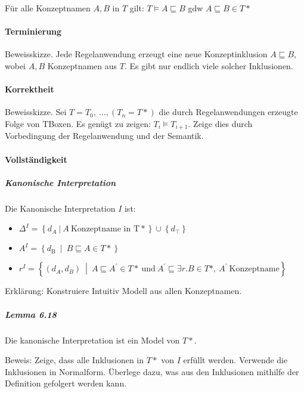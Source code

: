 Für alle Konzeptnamen $A,B$ in $T$ gilt:
$T \models A \sqsubseteq B$ gdw $A \sqsubseteq B \in T*$

\paragraph{Terminierung}\label{terminierung-1}

Beweisskizze. Jede Regelanwendung erzeugt eine neue Konzeptinklusion
$A \sqsubseteq B$, wobei $A,B$ Konzeptnamen aus $T$. Es gibt nur
endlich viele solcher Inklusionen.

\paragraph{Korrektheit}\label{korrektheit-1}

Beweisskizze. Sei $T = T_{0},\ \ldots,(T_{n} = T*)$ die durch
Regelanwendungen erzeugte Folge von TBoxen. Es genügt zu zeigen:
$T_{i} \models T_{i + 1}$. Zeige dies durch Vorbedingung der
Regelanwendung und der Semantik.

\paragraph{Vollständigkeit}\label{vollstuxe4ndigkeit-1}

\subparagraph{Kanonische
Interpretation}\label{kanonische-interpretation}

Die Kanonische Interpretation $I$ ist:

\begin{itemize}
\item
  $\Delta^{I} = \left\{ d_{A}\ |\ A\ \mathrm{\text{Konzeptname\ in\ T}}* \right\} \cup \left\{ d_{\top} \right\}$
\item
  $A^{I} = \left\{ d_{\text{B\ }} \middle| \ B \sqsubseteq A \in T* \right\}$
\item
  $r^{I} = \left\{ \left( d_{A},d_{B} \right)\  \middle| \ A \sqsubseteq A^{'} \in T*\ \mathrm{\text{und}}\ A^{'} \sqsubseteq \exists r.B \in T*,\ A^{'}\ \mathrm{\text{Konzeptname}} \right\}$
\end{itemize}

Erklärung: Konstruiere Intuitiv Modell aus allen Konzeptnamen.

\hypertarget{lemma-6.18}{\subparagraph{Lemma 6.18}\label{lemma-6.18}}

Die kanonische Interpretation ist ein Model von $T*$.

Beweis: Zeige, dass alle Inklusionen in $T*$ von $I$ erfüllt werden.
Verwende die Inklusionen in Normalform. Überlege dazu, was aus den
Inklusionen mithilfe der Definition gefolgert werden kann.

